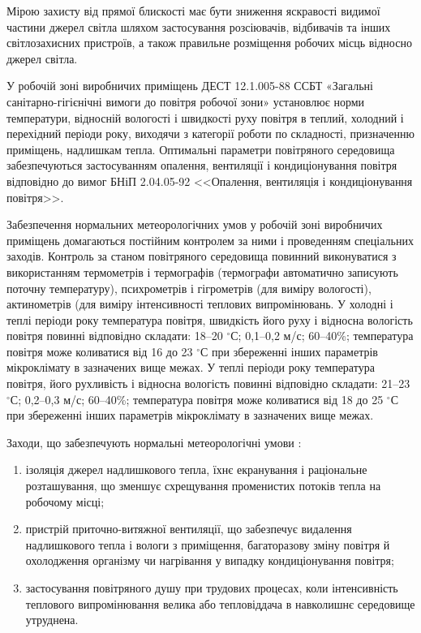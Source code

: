 Мірою захисту від прямої блискості має бути зниження яскравості видимої частини джерел світла шляхом застосування розсіювачів, відбивачів та інших світлозахисних пристроїв, а також правильне розміщення робочих місць відносно джерел світла.

У робочій зоні виробничих приміщень ДЕСТ 12.1.005-88 ССБТ «Загальні санітарно-гігієнічні вимоги до повітря робочої зони» установлює норми температури, відносній вологості і швидкості руху повітря в теплий, холодний і перехідний періоди року, виходячи з категорії роботи по складності, призначенню приміщень, надлишкам тепла. Оптимальні параметри повітряного середовища забезпечуються застосуванням опалення, вентиляції і кондиціонування повітря відповідно до вимог БНіП 2.04.05-92 <<Опалення, вентиляція і кондиціонування повітря>>.

Забезпечення нормальних метеорологічних умов у робочій зоні виробничих приміщень домагаються постійним контролем за ними і проведенням спеціальних заходів. Контроль за станом повітряного середовища повинний виконуватися  з використанням термометрів і термографів (термографи автоматично записують поточну температуру), психрометрів і гігрометрів (для виміру вологості), актинометрів  (для  виміру  інтенсивності  теплових  випромінювань.  У  холодні  і  теплі періоди року температура повітря, швидкість його руху і відносна вологість повітря повинні відповідно складати: 18--20 $^{\circ}$С; 0,1--0,2 м/с; 60--40\%; температура повітря може коливатися  від 16 до 23 $^{\circ}$С при збереженні інших параметрів мікроклімату  в зазначених вище межах. У теплі періоди року температура повітря, його рухливість і відносна вологість повинні відповідно складати: 21--23 $^{\circ}$С; 0,2--0,3 м/с; 60--40\%; температура повітря може коливатися від 18 до 25 $^{\circ}$С при збереженні інших параметрів мікроклімату в зазначених вище межах.

Заходи, що забезпечують нормальні метеорологічні умови : 
\begin{enumerate}
 \item ізоляція джерел надлишкового тепла, їхнє екранування і раціональне розташування, що зменшує схрещування променистих потоків тепла на робочому місці;
 \item пристрій приточно-витяжної вентиляції, що забезпечує видалення надлишкового тепла і вологи з приміщення, багаторазову зміну повітря й охолодження  організму чи  нагрівання у випадку кондиціонування повітря;
 \item застосування повітряного душу при трудових процесах, коли інтенсивність теплового випромінювання велика або тепловіддача в навколишнє середовище утруднена.
\end{enumerate}

